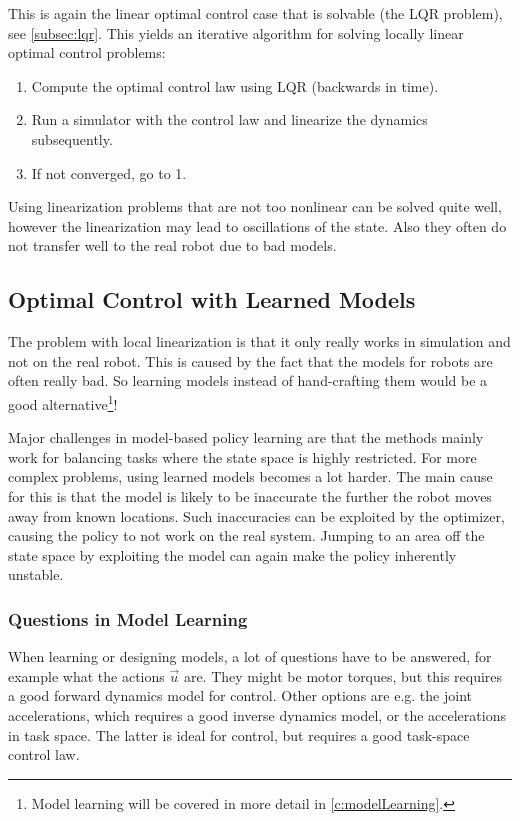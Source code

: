 				This is again the linear optimal control case that is solvable (the LQR problem), see \autoref{subsec:lqr}. This yields an iterative algorithm for solving locally linear optimal control problems:
				\begin{enumerate}
					\item Compute the optimal control law using LQR (backwards in time).
					\item Run a simulator with the control law and linearize the dynamics subsequently.
					\item If not converged, go to 1.
				\end{enumerate}
				Using linearization problems that are not too nonlinear can be solved quite well, however the linearization may lead to oscillations of the state. Also they often do not transfer well to the real robot due to bad models.

		\subsection{Optimal Control with Learned Models}
			The problem with local linearization is that it only really works in simulation and not on the real robot. This is caused by the fact that the models for robots are often really bad. So learning models instead of hand-crafting them would be a good alternative\footnote{Model learning will be covered in more detail in \autoref{c:modelLearning}.}!

			Major challenges in model-based policy learning are that the methods mainly work for balancing tasks where the state space is highly restricted. For more complex problems, using learned models becomes a lot harder. The main cause for this is that the model is likely to be inaccurate the further the robot moves away from known locations. Such inaccuracies can be exploited by the optimizer, causing the policy to not work on the real system. Jumping to an area off the state space by exploiting the model can again make the policy inherently unstable.

			\subsubsection{Questions in Model Learning}
				When learning or designing models, a lot of questions have to be answered, for example what the actions \(\vec{u}\) are. They might be motor torques, but this requires a good forward dynamics model for control. Other options are e.g. the joint accelerations, which requires a good inverse dynamics model, or the accelerations in task space. The latter is ideal for control, but requires a good task-space control law.

